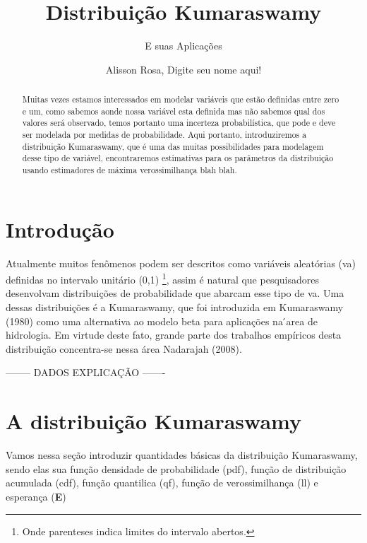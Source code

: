 \documentclass[
]{article}
\title{Distribuição Kumaraswamy}
\subtitle{E suas Aplicações}
\author{Alisson Rosa, Digite seu nome aqui!}
\date{}
\begin{document}
\maketitle
\begin{abstract}
Muitas vezes estamos interessados em modelar variáveis que estão
definidas entre zero e um, como sabemos aonde nossa variável esta
definida mas não sabemos qual dos valores será observado, temos portanto
uma incerteza probabilística, que pode e deve ser modelada por medidas
de probabilidade. Aqui portanto, introduziremos a distribuição
Kumaraswamy, que é uma das muitas possibilidades para modelagem desse
tipo de variável, encontraremos estimativas para os parâmetros da
distribuição usando estimadores de máxima verossimilhança blah blah.
\end{abstract}
\ifdefined\Shaded\renewenvironment{Shaded}{\begin{tcolorbox}[breakable, frame hidden, interior hidden, borderline west={3pt}{0pt}{shadecolor}, boxrule=0pt, enhanced, sharp corners]}{\end{tcolorbox}}\fi

\section{\centering Introdução}

Atualmente muitos fenômenos podem ser descritos como variáveis
aleatórias (va) definidas no intervalo unitário (0,1) \footnote{Onde
  parenteses indica limites do intervalo abertos.}, assim é natural que
pesquisadores desenvolvam distribuições de probabilidade que abarcam
esse tipo de va. Uma dessas distribuições é a Kumaraswamy, que foi
introduzida em Kumaraswamy (1980) como uma alternativa ao modelo beta
para aplicações na ́area de hidrologia. Em virtude deste fato, grande
parte dos trabalhos empíricos desta distribuição concentra-se nessa área
Nadarajah (2008).

-------- DADOS EXPLICAÇÃO -------

\section{\centering A distribuição Kumaraswamy}

Vamos nessa seção introduzir quantidades básicas da distribuição
Kumaraswamy, sendo elas sua função densidade de probabilidade (pdf),
função de distribuição acumulada (cdf), função quantilica (qf), função
de verossimilhança (ll) e esperança (\textbf{E})
\end{document}
